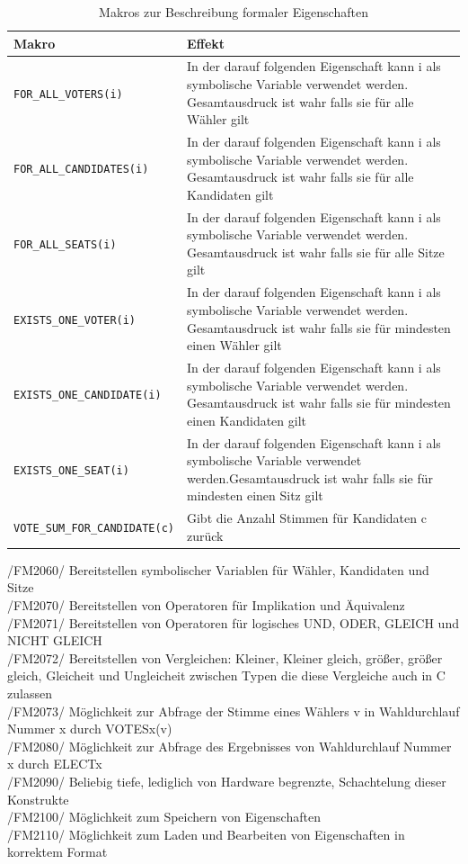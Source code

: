 \documentclass[a4paper]{scrreprt}
\begin{document}
\begin{table}[H]
\caption{Makros zur Beschreibung formaler Eigenschaften}
\begin{tabular}{|p{5cm}|p{10cm}|}
\hline 
Makro & Effekt \\
\hline 
\verb!FOR_ALL_VOTERS(i)! & In der darauf folgenden Eigenschaft kann i als symbolische Variable verwendet werden. Gesamtausdruck ist wahr falls sie für alle Wähler gilt \\
\hline 
\verb!FOR_ALL_CANDIDATES(i)! & In der darauf folgenden Eigenschaft kann i als symbolische Variable verwendet werden. Gesamtausdruck ist wahr falls sie für alle Kandidaten gilt \\
\hline 
\verb!FOR_ALL_SEATS(i)! & In der darauf folgenden Eigenschaft kann i als symbolische Variable verwendet werden. Gesamtausdruck ist wahr falls sie für alle Sitze gilt \\
\hline 
\verb!EXISTS_ONE_VOTER(i)! & In der darauf folgenden Eigenschaft kann i als symbolische Variable verwendet werden. Gesamtausdruck ist wahr falls sie für mindesten einen Wähler gilt \\
\hline 
\verb!EXISTS_ONE_CANDIDATE(i)! & In der darauf folgenden Eigenschaft kann i als symbolische Variable verwendet werden. Gesamtausdruck ist wahr falls sie für mindesten einen Kandidaten gilt \\
\hline 
\verb!EXISTS_ONE_SEAT(i)! & In der darauf folgenden Eigenschaft kann i als symbolische Variable verwendet werden.Gesamtausdruck ist wahr falls sie für mindesten einen Sitz gilt \\
\hline 
\verb!VOTE_SUM_FOR_CANDIDATE(c)! & Gibt die Anzahl Stimmen für Kandidaten c zurück\\
\hline 
\end{tabular}
\label{table:Macros_for_formal_Attributes}
\end{table}

/FM2060/ Bereitstellen symbolischer Variablen für Wähler, Kandidaten und Sitze \\
/FM2070/ Bereitstellen von Operatoren für Implikation und Äquivalenz \\
/FM2071/ Bereitstellen von Operatoren für logisches UND, ODER, GLEICH und NICHT GLEICH \\
/FM2072/ Bereitstellen von Vergleichen: Kleiner, Kleiner gleich, größer, größer gleich,  Gleicheit und Ungleicheit zwischen Typen die diese Vergleiche auch in C zulassen \\
/FM2073/ Möglichkeit zur Abfrage der Stimme eines Wählers v in Wahldurchlauf Nummer x durch VOTESx(v)\\
/FM2080/ Möglichkeit zur Abfrage des Ergebnisses von Wahldurchlauf Nummer x durch ELECTx \\
/FM2090/ Beliebig tiefe, lediglich von Hardware begrenzte, Schachtelung dieser Konstrukte \\
/FM2100/ Möglichkeit zum Speichern von Eigenschaften \\
/FM2110/ Möglichkeit zum Laden und Bearbeiten von Eigenschaften in korrektem Format
\end{document}
